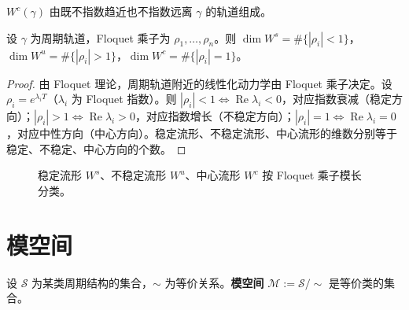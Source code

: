 \begin{definition}[中心流形]\label{def:centre_manifold}
$W^c(\gamma)$ 由既不指数趋近也不指数远离 $\gamma$ 的轨道组成。
\end{definition}

\begin{proposition}\label{prop:stable_floquet}
设 $\gamma$ 为周期轨道，Floquet 乘子为 $\rho_1, \dots, \rho_n$。则 $\dim W^s = \#\{|\rho_i| < 1\}$，$\dim W^u = \#\{|\rho_i| > 1\}$，$\dim W^c = \#\{|\rho_i| = 1\}$。
\end{proposition}

\begin{proof}
由 Floquet 理论，周期轨道附近的线性化动力学由 Floquet 乘子决定。设 $\rho_i = e^{\lambda_i T}$（$\lambda_i$ 为 Floquet 指数）。则 $|\rho_i| < 1 \iff \operatorname{Re}\lambda_i < 0$，对应指数衰减（稳定方向）；$|\rho_i| > 1 \iff \operatorname{Re}\lambda_i > 0$，对应指数增长（不稳定方向）；$|\rho_i| = 1 \iff \operatorname{Re}\lambda_i = 0$，对应中性方向（中心方向）。稳定流形、不稳定流形、中心流形的维数分别等于稳定、不稳定、中心方向的个数。
\end{proof}

\begin{figure}[htbp]
\centering
{}
\caption{稳定流形 $W^s$、不稳定流形 $W^u$、中心流形 $W^c$ 按 Floquet 乘子模长分类。}
\label{fig:stable_manifolds}
\end{figure}

\section{模空间}

\begin{definition}[模空间]\label{def:moduli_space}
设 $\mathcal{S}$ 为某类周期结构的集合，$\sim$ 为等价关系。\textbf{模空间} $\mathcal{M} := \mathcal{S}/\sim$ 是等价类的集合。
\end{definition}

